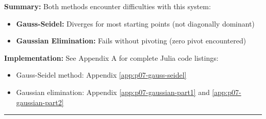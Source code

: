 \textbf{Summary:} Both methods encounter difficulties with this system:
\begin{itemize}
\item \textbf{Gauss-Seidel:} Diverges for most starting points (not diagonally dominant)
\item \textbf{Gaussian Elimination:} Fails without pivoting (zero pivot encountered)
\end{itemize}

\textbf{Implementation:} See Appendix A for complete Julia code listings:
\begin{itemize}
\item Gauss-Seidel method: Appendix \ref{app:p07-gauss-seidel}
\item Gaussian elimination: Appendix \ref{app:p07-gaussian-part1} and \ref{app:p07-gaussian-part2}
\end{itemize}

\vspace{2em}
\noindent\rule{\textwidth}{0.4pt}
